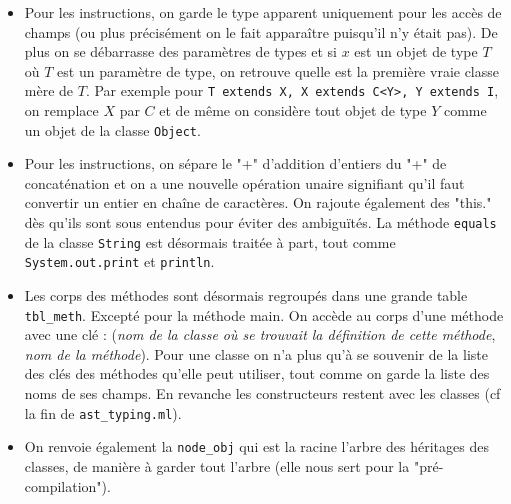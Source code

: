 \documentclass[12pt,a4paper]{report}
\begin{document}
\begin{itemize}
\item Pour les instructions, on garde le type apparent uniquement pour les accès de champs (ou plus précisément on le fait apparaître puisqu'il n'y était pas). De plus on se débarrasse des paramètres de types et si $x$ est un objet de type $T$ où $T$ est un paramètre de type, on retrouve quelle est la première vraie classe mère de $T$. Par exemple pour \texttt{T extends X, X extends C<Y>, Y extends I}, on remplace $X$ par $C$ et de même on considère tout objet de type $Y$ comme un objet de la classe \texttt{Object}.
\item Pour les instructions, on sépare le "+" d'addition d'entiers du "+" de concaténation et on a une nouvelle opération unaire signifiant qu'il faut convertir un entier en chaîne de caractères. On rajoute également des "this." dès qu'ils sont sous entendus pour éviter des ambiguïtés. La méthode \texttt{equals} de la classe \texttt{String} est désormais traitée à part, tout comme \texttt{System.out.print} et \texttt{println}. 
\item Les corps des méthodes sont désormais regroupés dans une grande table \texttt{tbl\_meth}. Excepté pour la méthode main. On accède au corps d'une méthode avec une clé : (\textit{nom de la classe où se trouvait la définition de cette méthode}, \textit{nom de la méthode}). Pour une classe on n'a plus qu'à se souvenir de la liste des clés des méthodes qu'elle peut utiliser, tout comme on garde la liste des noms de ses champs. En revanche les constructeurs restent avec les classes (cf la fin de \texttt{ast\_typing.ml}).
\item On renvoie également la \texttt{node\_obj} qui est la racine l'arbre des héritages des classes, de manière à garder tout l'arbre (elle nous sert pour la "pré-compilation").
\end{itemize}
\end{document}
